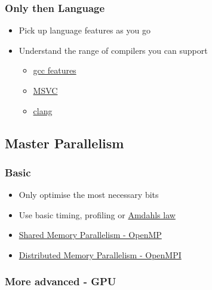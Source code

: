 \subsubsection{Only then Language}\label{only-then-language}

\begin{itemize}
\itemsep1pt\parskip0pt
\item
  Pick up language features as you go
\item
  Understand the range of compilers you can support

  \begin{itemize}
  \itemsep1pt\parskip0pt
  \item
    \href{https://gcc.gnu.org/projects/cxx-status.html}{gcc features}
  \item
    \href{https://docs.microsoft.com/en-us/cpp/visual-cpp-language-conformance?view=vs-2017}{MSVC}
  \item
    \href{https://clang.llvm.org/cxx_status.html}{clang}
  \end{itemize}
\end{itemize}

\subsection{Master Parallelism}\label{master-parallelism}

\subsubsection{Basic}\label{basic}

\begin{itemize}
\itemsep1pt\parskip0pt
\item
  Only optimise the most necessary bits
\item
  Use basic timing, profiling or
  \href{https://en.wikipedia.org/wiki/Amdahl\%27s_law}{Amdahls law}
\item
  \href{https://www.openmp.org/}{Shared Memory Parallelism - OpenMP}
\item
  \href{https://www.open-mpi.org/}{Distributed Memory Parallelism -
  OpenMPI}
\end{itemize}

\subsubsection{More advanced - GPU}\label{more-advanced---gpu}

